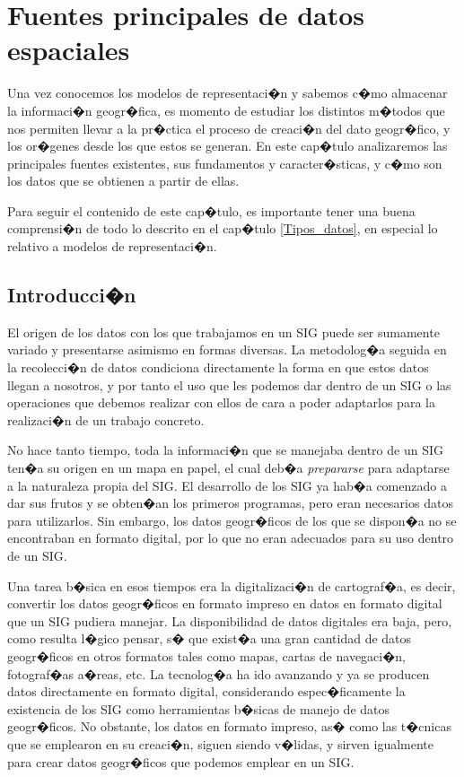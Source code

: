 
\chapter{Fuentes principales de datos espaciales}
\label{Fuentes_datos}

 

\bigskip

\begin{intro}
Una vez conocemos los modelos de representaci�n y sabemos c�mo almacenar la informaci�n geogr�fica, es momento de estudiar los distintos m�todos que nos permiten llevar a la pr�ctica el proceso de creaci�n del dato geogr�fico, y los or�genes desde los que estos se generan. En este cap�tulo analizaremos las principales fuentes existentes, sus fundamentos  y caracter�sticas, y c�mo son los datos que se obtienen a partir de ellas.

Para seguir el contenido de este cap�tulo, es importante tener una buena comprensi�n de todo lo descrito en el cap�tulo \ref{Tipos_datos}, en especial lo relativo a modelos de representaci�n.
\end{intro}

\section{Introducci�n}
\pagestyle{fancy}

El origen de los datos con los que trabajamos en un SIG puede ser sumamente variado y presentarse asimismo en formas diversas. La metodolog�a seguida en la recolecci�n de datos condiciona directamente la forma en que estos datos llegan a nosotros, y por tanto el uso que les podemos dar dentro de un SIG o las operaciones que debemos realizar con ellos de cara a poder adaptarlos para la realizaci�n de un trabajo concreto.

No hace tanto tiempo, toda la informaci�n que se manejaba dentro de un SIG ten�a su origen en un mapa en papel, el cual deb�a \emph{prepararse} para adaptarse a la naturaleza propia del SIG. El desarrollo de los SIG ya hab�a comenzado a dar sus frutos y se obten�an los primeros programas, pero eran necesarios datos para utilizarlos. Sin embargo, los datos geogr�ficos de los que se dispon�a no se encontraban en formato digital, por lo que no eran adecuados para su uso dentro de un SIG.

Una tarea b�sica en esos tiempos era la digitalizaci�n de cartograf�a, es decir, convertir los datos geogr�ficos en formato impreso en datos en formato digital que un SIG pudiera manejar. La disponibilidad de datos digitales era baja, pero, como resulta l�gico pensar, s� que exist�a una gran cantidad de datos geogr�ficos en otros formatos tales como mapas, cartas de navegaci�n, fotograf�as a�reas, etc. La tecnolog�a ha ido avanzando y ya se producen datos directamente en formato digital, considerando espec�ficamente la existencia de los SIG como herramientas b�sicas de manejo de datos geogr�ficos. No obstante, los datos en formato impreso, as� como las t�cnicas que se emplearon en su creaci�n, siguen siendo v�lidas, y sirven igualmente para crear datos geogr�ficos que podemos emplear en un SIG.

